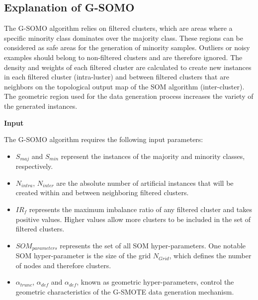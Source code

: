 \documentclass[parskip=full]{scrartcl}
\begin{document}
\subsection{Explanation of G-SOMO}

The G-SOMO algorithm relies on filtered clusters, which are areas where a
specific minority class dominates over the majority class. These regions can be
considered as safe areas for the generation of minority samples. Outliers or
noisy examples should belong to non-filtered clusters and are therefore ignored.
The density and weights of each filtered cluster are calculated to create new
instances in each filtered cluster (intra-luster) and between filtered clusters
that are neighbors on the topological output map of the SOM algorithm
(inter-cluster). The geometric region used for the data generation process
increases the variety of the generated instances.

\textbf{Input} 

The G-SOMO algorithm requires the following input parameters: 

\begin{itemize}

	\renewcommand\labelitemi{--}

	\item $S_{maj}$ and $S_{min}$ represent the instances of the majority and
	minority classes, respectively. 

	\item $N_{intra}$, $N_{inter}$ are the absolute number of artificial
	instances that will be created within and between neighboring filtered
	clusters.

	\item $IR_{f}$ represents the maximum imbalance ratio of any filtered
	cluster and takes positive values. Higher values allow more clusters to be
	included in the set of filtered clusters.
	
	\item $SOM_{parameters}$ represents the set of all SOM hyper-parameters. One
	notable SOM hyper-parameter is the size of the grid $N_{Grid}$, which defines the
	number of nodes and therefore clusters. 

	\item $\alpha_{trunc}$, $\alpha_{def}$ and $\alpha_{def}$, known as
	geometric hyper-parameters, control the geometric characteristics of the 
	G-SMOTE data generation mechanism.

\end{itemize}
\end{document}
